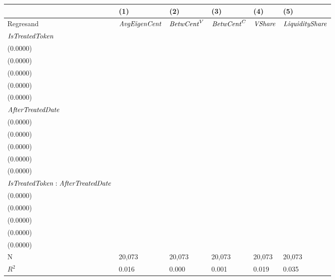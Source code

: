 \begin{tabular}{llllll}
\toprule
{} &                                      (1) &                                     (2) &                                      (3) &                                      (4) &                                      (5) \\
\midrule
Regresand                                     &                     ${\it AvgEigenCent}$ &                      ${\it BetwCent}^V$ &                       ${\it BetwCent}^C$ &                           ${\it VShare}$ &                   ${\it LiquidityShare}$ \\
${\it IsTreatedToken}$                        &     \makecell{$0.0000^{}$ \\ ($0.0000$)} &    \makecell{$0.0000^{}$ \\ ($0.0000$)} &     \makecell{$0.0000^{}$ \\ ($0.0000$)} &     \makecell{$0.0000^{}$ \\ ($0.0000$)} &     \makecell{$0.0000^{}$ \\ ($0.0000$)} \\
${\it AfterTreatedDate}$                      &  \makecell{$0.0009^{***}$ \\ ($0.0000$)} &  \makecell{$0.0000^{**}$ \\ ($0.0000$)} &  \makecell{$0.0000^{***}$ \\ ($0.0000$)} &  \makecell{$0.0003^{***}$ \\ ($0.0000$)} &  \makecell{$0.0008^{***}$ \\ ($0.0000$)} \\
${\it IsTreatedToken}:{\it AfterTreatedDate}$ &     \makecell{$0.0000^{}$ \\ ($0.0000$)} &    \makecell{$0.0000^{}$ \\ ($0.0000$)} &     \makecell{$0.0000^{}$ \\ ($0.0000$)} &     \makecell{$0.0000^{}$ \\ ($0.0000$)} &     \makecell{$0.0000^{}$ \\ ($0.0000$)} \\
\midrule N                                    &                                   20,073 &                                  20,073 &                                   20,073 &                                   20,073 &                                   20,073 \\
$R^2$                                         &                                    0.016 &                                   0.000 &                                    0.001 &                                    0.019 &                                    0.035 \\
\bottomrule
\end{tabular}
